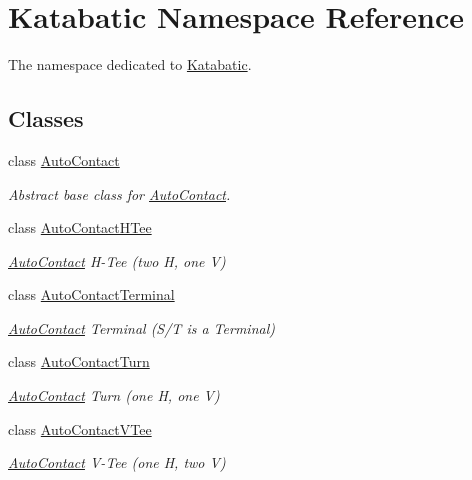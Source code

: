 \hypertarget{namespaceKatabatic}{}\section{Katabatic Namespace Reference}
\label{namespaceKatabatic}


The namespace dedicated to \hyperlink{namespaceKatabatic}{Katabatic}.  


\subsection*{Classes}
\begin{DoxyCompactItemize}
\item 
class \hyperlink{classKatabatic_1_1AutoContact}{Auto\+Contact}
\begin{DoxyCompactList}\small\item\em Abstract base class for \hyperlink{classKatabatic_1_1AutoContact}{Auto\+Contact}. \end{DoxyCompactList}\item 
class \hyperlink{classKatabatic_1_1AutoContactHTee}{Auto\+Contact\+H\+Tee}
\begin{DoxyCompactList}\small\item\em \hyperlink{classKatabatic_1_1AutoContact}{Auto\+Contact} H-\/\+Tee (two H, one V) \end{DoxyCompactList}\item 
class \hyperlink{classKatabatic_1_1AutoContactTerminal}{Auto\+Contact\+Terminal}
\begin{DoxyCompactList}\small\item\em \hyperlink{classKatabatic_1_1AutoContact}{Auto\+Contact} Terminal (S/T is a Terminal) \end{DoxyCompactList}\item 
class \hyperlink{classKatabatic_1_1AutoContactTurn}{Auto\+Contact\+Turn}
\begin{DoxyCompactList}\small\item\em \hyperlink{classKatabatic_1_1AutoContact}{Auto\+Contact} Turn (one H, one V) \end{DoxyCompactList}\item 
class \hyperlink{classKatabatic_1_1AutoContactVTee}{Auto\+Contact\+V\+Tee}
\begin{DoxyCompactList}\small\item\em \hyperlink{classKatabatic_1_1AutoContact}{Auto\+Contact} V-\/\+Tee (one H, two V) \end{DoxyCompactList}\item 

\end{DoxyCompactItemize}
